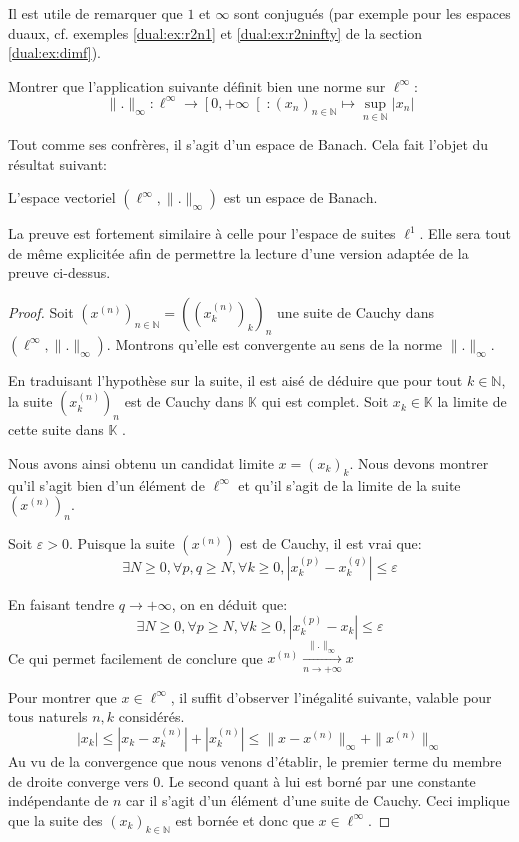 \begin{rem}
  Il est utile de remarquer que $1$ et $\infty$ sont
  conjugués (par exemple pour les espaces duaux, cf.
  exemples \ref{dual:ex:r2n1} et \ref{dual:ex:r2ninfty}
  de la section \ref{dual:ex:dimf}).
\end{rem}

\begin{exo}
  Montrer que l'application suivante définit bien une
  norme sur $\ell^\infty$:
  $$\|.\|_\infty:\ell^\infty\to\left[0,+\infty\right[:
  (x_n)_{n\in\mathbb{N}}\mapsto\sup_{n\in\mathbb{N}}|x_n|$$
\end{exo}

Tout comme ses confrères, il s'agit d'un espace de
Banach. Cela fait l'objet du résultat suivant:
\begin{prop}
  L'espace vectoriel $(\ell^\infty, \|.\|_\infty)$ est
  un espace de Banach.
\end{prop}
La preuve est fortement similaire à celle pour l'espace
de suites $\ell^1$. Elle sera tout de même explicitée
afin de permettre la lecture d'une version adaptée de
la preuve ci-dessus.
\begin{proof}
  Soit $\left(x^{(n)}\right)_{n\in\mathbb{N}}=
  \left(\left(x_k^{(n)}\right)_k\right)_n$ une suite de
  Cauchy dans $(\ell^\infty, \|.\|_\infty)$. Montrons qu'elle est convergente
  au sens de la norme $\|.\|_\infty$.

  En traduisant l'hypothèse sur la suite, il est aisé de déduire que
  pour tout $k\in\mathbb{N}$, la suite $(x_k^{(n)})_n$ est de Cauchy dans
  $\mathbb{K}$ qui est complet. Soit $x_k\in\mathbb{K}$ la limite
  de cette suite dans $\mathbb{K}$ .

  Nous avons ainsi obtenu un candidat limite $x=(x_k)_k$. Nous devons
  montrer qu'il s'agit bien d'un élément de $\ell^\infty$ et qu'il s'agit de
  la limite de la suite $(x^{(n)})_n$.

  Soit $\varepsilon>0$. Puisque la suite $(x^{(n)})$ est de
  Cauchy, il est vrai que:
  $$ \exists  N\geq 0, \forall  p, q\geq N,
   \forall {k\geq0},| x^{(p)}_k - x^{(q)}_k|\leq\varepsilon$$

  En faisant tendre $q\to+\infty$, on en déduit que:
  $$ \exists N\geq 0, \forall  p\geq N,
   \forall {k\geq0} , | x^{(p)}_k - x_k| \leq \varepsilon$$
  Ce qui permet facilement de conclure que
  $x^{(n)}\xrightarrow[n\to+\infty]{\|.\|_\infty}x$

  Pour montrer que $x\in\ell^\infty$, il suffit d'observer l'inégalité
  suivante, valable pour tous naturels $n, k$ considérés.
  $$|x_k|
  \leq |x_k-x_k^ {(n)}|+ |x_k^{(n)}|
  \leq \|x-x^{(n)}\|_\infty+\|x^{(n)}\|_\infty$$
  Au vu de la convergence que nous venons d'établir, le premier terme
  du membre de droite converge vers $0$. Le second quant à lui est
  borné par une constante indépendante de $n$ car il s'agit d'un
  élément d'une suite de Cauchy. Ceci implique que la suite des
  $(x_k)_{k\in\mathbb{N}}$ est bornée et donc que $x\in\ell^\infty$.
\end{proof}

